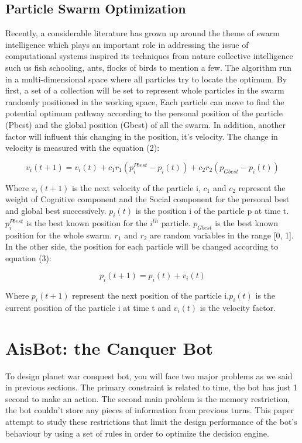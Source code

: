 \documentclass[]{interact}
\theoremstyle{plain}%
\theoremstyle{definition}
\theoremstyle{remark}
\begin{document}
\subsection{Particle Swarm Optimization}
Recently, a considerable literature has grown up around the theme of swarm intelligence which plays an important role in addressing the issue of computational systems inspired its techniques from nature collective intelligence such us fish schooling, ants, flocks of birds to mention a few. The algorithm run in a multi-dimensional space where all particles try to locate the optimum. By first, a set of a collection will be set to represent whole particles in the swarm randomly positioned in the working space, Each particle can move to find the potential optimum pathway according to the personal position of the particle (Pbest)  and the global position (Gbest) of all the swarm. In addition, another factor will influent this changing in the position, it's velocity. The change in velocity is measured with the equation (2):

\begin{equation}
v_{i}(t+1) = v_{i}(t) + c_{1}r_{1}(p_{i}^{Pbest}-p_{i}(t))  + c_{2}r_{2}(p_{Gbest}-p_{i}(t))
\end{equation}

Where $v_{i}(t+1)$ is the next velocity of the particle i, $c_{1}$ and $c_{2}$ represent the weight of Cognitive component and the Social component  for the personal best and global best successively. $p_{i}(t)$ is the position i of the particle p at time t. $p_{i}^{Pbest}$ is the best known position for the $i^{th}$ particle. $p_{Gbest}$ is the best known position for the whole swarm. $r_{1}$ and $r_{2}$ are random variables in the range [0, 1]. In the other side, the position for each particle  will be changed according to equation (3):

\begin{equation}
p_{i}(t+1) = p_{i}(t) + v_{i}(t)
\end{equation}

Where $p_{i}(t+1)$ represent the next position of the particle i.$p_{i}(t)$ is the current position of the particle i at time t and $v_{i}(t)$ is the velocity factor.

\section{AisBot: the Canquer Bot}

To design planet war conquest bot, you will face two major problems as we said in previous sections. The primary constraint is related to time, the bot has just 1 second to make an action. The second main problem is the memory restriction, the bot couldn't store any pieces of information from previous turns. This paper attempt to study these restrictions that limit the design performance of the bot's behaviour by using a set of rules in order to optimize the decision engine. \\
\end{document}
